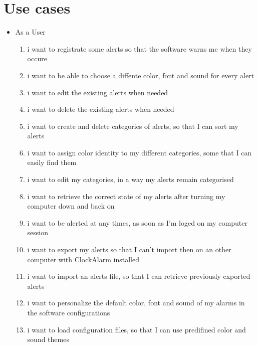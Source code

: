 \chapter{Use cases}

\begin{itemize}
\item As a User
\begin{enumerate}
\item i want to registrate some alerts so that the software warns me when they occure
\item i want to be able to choose a diffente color, font and sound for every alert
\item i want to edit the existing alerts when needed
\item i want to delete the existing alerts when needed
\item i want to create and delete categories of alerts, so that I can sort my alerts
\item i want to assign color identity to my different categories, some that I can easily find them
\item i want to edit my categories, in a way my alerts remain categorised
\item i want to retrieve the correct state of my alerts after turning my computer down and back on
\item i want to be alerted at any times, as soon as I'm loged on my computer session
\item i want to export my alerts so that I can't import then on an other computer with ClockAlarm installed
\item i want to import an alerts file, so that I can retrieve previously exported alerts
\item i want to personalize the default color, font and sound of my alarms in the software configurations
\item i want to load configuration files, so that I can use predifined color and sound themes
\end{enumerate}
\end{itemize}